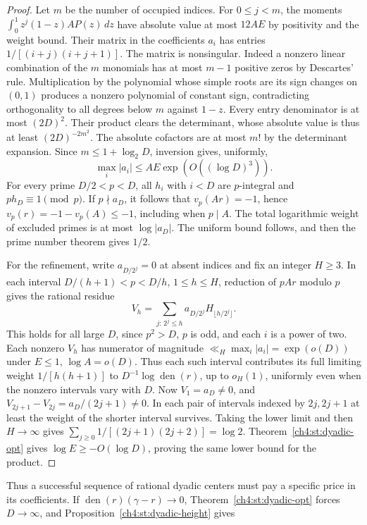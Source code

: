 \documentclass[11pt,a4paper,oneside,openany]{report}
\theoremstyle{remark}\newtheorem{remark}[theorem]{Remark}
\numberwithin{equation}{section}
\begin{document}
\begin{proof}
Let $m$ be the number of occupied indices. For $0\le j<m$, the
moments $\int_0^1z^j(1-z) A P(z)\,dz$ have absolute value at most
$12AE$ by positivity and the weight bound. Their matrix in the
coefficients $a_i$ has entries $1/[(i+j)(i+j+1)]$. The matrix is
nonsingular. Indeed a nonzero linear combination of the $m$ monomials
has at most $m-1$ positive zeros by Descartes' rule. Multiplication by
the polynomial whose simple roots are its sign changes on $(0,1)$
produces a nonzero polynomial of constant sign, contradicting
orthogonality to all degrees below $m$ against $1-z$. Every entry
denominator is at most $(2D)^2$. Their product clears the determinant,
whose absolute value is thus at least $(2D)^{-2m^2}$. The absolute
cofactors are at most $m!$ by the determinant expansion. Since
$m\le1+\log_2 D$, inversion gives, uniformly,
\[
                     \max_i|a_i|\le AE\exp(O((\log D)^3)).
\]
For every prime $D/2<p<D$, all $h_i$ with $i<D$ are $p$-integral
and $p h_D\equiv1\pmod p$. If $p\nmid a_D$, it follows that
$v_p(Ar)=-1$, hence $v_p(r)=-1-v_p(A)\le-1$, including when $p\mid A$.
The total logarithmic weight of excluded primes is at most $\log|a_D|$.
The uniform bound follows, and then the prime number theorem gives $1/2$.

For the refinement, write $a_{D/2^j}=0$ at absent indices and fix an
integer $H\ge3$. In each interval $D/(h+1)<p<D/h$, $1\le h\le H$,
reduction of $pAr$ modulo $p$ gives the rational residue
\[
                  V_h=\sum_{j:\,2^j\le h}a_{D/2^j}H_{\lfloor h/2^j\rfloor}.
\]
This holds for all large $D$, since $p^2>D$, $p$ is odd, and each $i$
is a power of two. Each nonzero $V_h$ has numerator of magnitude
$\ll_H\max_i |a_i|=\exp(o(D))$ under $E\le1$, $\log A=o(D)$.
Thus each such interval contributes its full limiting weight
$1/[h(h+1)]$ to $D^{-1}\log\operatorname{den}(r)$, up to $o_H(1)$,
uniformly even when the nonzero intervals vary with $D$.
Now $V_1=a_D\ne0$, and $V_{2j+1}-V_{2j}=a_D/(2j+1)\ne0$.
In each pair of intervals indexed by $2j,2j+1$ at least the weight
of the shorter interval survives. Taking the lower limit and then
$H\to\infty$ gives $\sum_{j\ge0}1/[(2j+1)(2j+2)]=\log2$.
Theorem~\ref{ch4:st:dyadic-opt} gives $\log E\ge-O(\log D)$, proving the
same lower bound for the product.
\end{proof}
Thus a successful sequence of rational dyadic centers must pay a specific price in its coefficients. If $\operatorname{den}(r)(\gamma-r)\to0$, Theorem~\ref{ch4:st:dyadic-opt} forces $D\to\infty$, and Proposition~\ref{ch4:st:dyadic-height} gives
\end{document}
